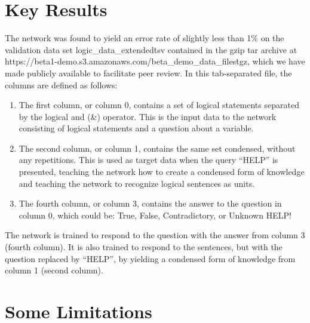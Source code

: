 \documentclass{article}
\begin{document}
\section{Key Results}

The network was found to yield an error rate of slightly less than 1\% on the validation data set logic\_data\_extended\.tsv contained in the gzip tar archive at https://beta1-demo.s3.amazonaws.com/beta\_demo\_data\_files\.tgz, which we have made publicly available to facilitate peer review. In this tab-separated file, the columns are defined as follows:

\begin{enumerate}
	\item The first column, or column 0, contains a set of logical statements separated by the logical and (\&) operator. This is the input data to the network consisting of logical statements and a question about a variable.
	\item The second column, or column 1, contains the same set condensed, without any repetitions. This is used as target data when the query “HELP” is presented, teaching the network how to create a condensed form of knowledge and teaching the network to recognize logical sentences as units.
	\item The fourth column, or column 3, contains the answer to the question in column 0, which could be: True, False, Contradictory, or Unknown HELP!
\end{enumerate}

The network is trained to respond to the question with the answer from column 3 (fourth column). It is also trained to respond to the sentences, but with the question replaced by “HELP”, by yielding a condensed form of knowledge from column 1 (second column).

\section{Some Limitations}
\end{document}
